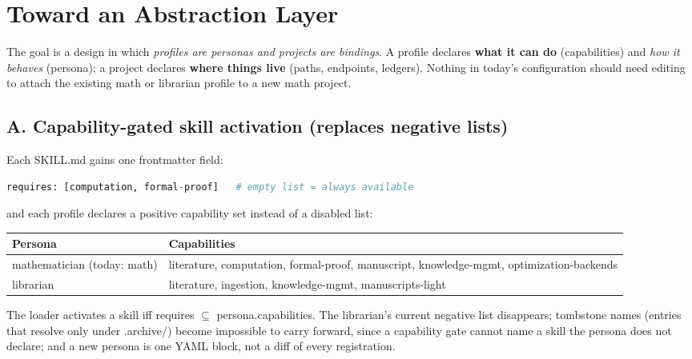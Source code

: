 \documentclass[10pt]{article}
\newcommand{\mono}[1]{{\ttfamily\small #1}}
\begin{document}
\section{Toward an Abstraction Layer}\label{sec:abstraction}

The goal is a design in which \emph{profiles are personas and projects are bindings}. A profile
declares \textbf{what it can do} (capabilities) and \emph{how it behaves} (persona); a project
declares \textbf{where things live} (paths, endpoints, ledgers). Nothing in today's configuration
should need editing to attach the existing math or librarian profile to a new math project.

\subsection*{A. Capability-gated skill activation (replaces negative lists)}

Each \mono{SKILL.md} gains one frontmatter field:

\begin{lstlisting}[language=Python]
requires: [computation, formal-proof]   # empty list = always available
\end{lstlisting}

and each profile declares a positive capability set instead of a disabled list:

\begin{center}\small
\renewcommand{\arraystretch}{1.15}
\begin{tabularx}{\textwidth}{@{}l X@{}}
\toprule
Persona & Capabilities\\
\midrule
\mono{mathematician} (today: math) & literature, computation, formal-proof, manuscript, knowledge-mgmt, optimization-backends\\
\mono{librarian} & literature, ingestion, knowledge-mgmt, manuscripts-light\\
\bottomrule
\end{tabularx}
\end{center}

The loader activates a skill iff \mono{requires $\subseteq$ persona.capabilities}. The librarian's
current negative list disappears; tombstone names (entries that resolve only under
\mono{.archive/}) become impossible to carry forward, since a capability gate cannot name a skill the
persona does not declare; and a new persona is one YAML block, not a diff of every registration.
\end{document}
